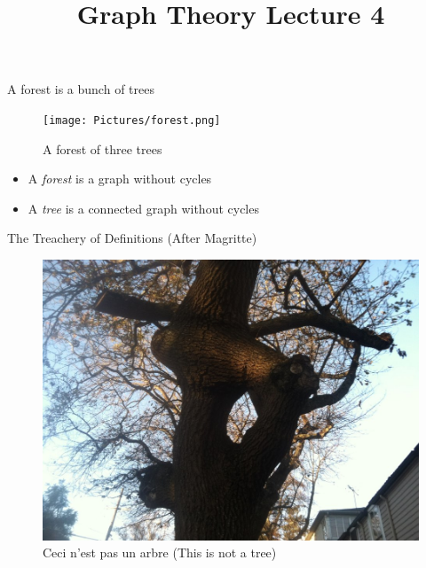 \documentclass{beamer}
\title{Graph Theory Lecture 4}
\begin{document}
\begin{frame}{A forest is a bunch of trees}
  \begin{figure}
            \texttt{[image: Pictures/forest.png]}
\caption{A forest of three trees}
  \end{figure}

  \begin{definition}\begin{itemize}
    \item A \emph{forest} is a graph without cycles
    \item A \emph{tree} is a connected graph without cycles
    \end{itemize}
  \end{definition}
\end{frame}

\begin{frame}{The Treachery of Definitions (After Magritte)}
  \begin{figure}
    \includegraphics[width=.85\textwidth]{Pictures/NotATree.jpg}
    \caption{Ceci n'est pas un arbre  (This is not a tree)} 
\end{figure}
\end{frame}
\end{document}
